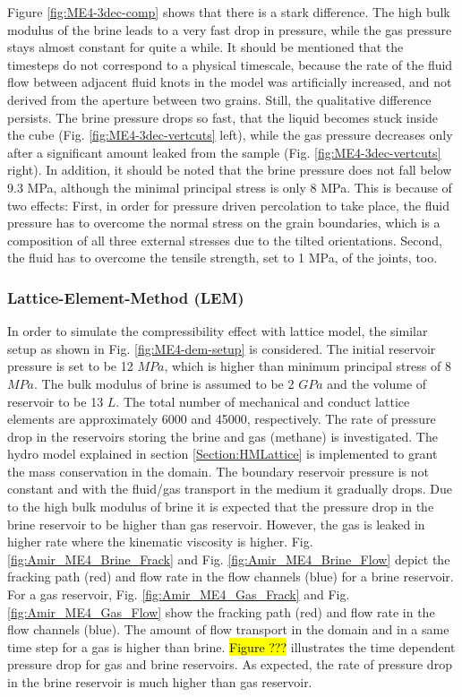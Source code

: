 Figure \ref{fig:ME4-3dec-comp} shows that there is a stark difference. The high bulk modulus of the brine leads to a very fast drop in pressure, while the gas pressure stays almost constant for quite a while. It should be mentioned that the timesteps do not correspond to a physical timescale, because the rate of the fluid flow between adjacent fluid knots in the model was artificially increased, and not derived from the aperture between two grains. Still, the qualitative difference persists. The brine pressure drops so fast, that the liquid becomes stuck inside the cube (Fig. \ref{fig:ME4-3dec-vertcuts} left), while the gas pressure decreases only after a significant amount leaked from the sample (Fig. \ref{fig:ME4-3dec-vertcuts} right). In addition, it should be noted that the brine pressure does not fall below 9.3 MPa, although the minimal principal stress is only 8 MPa. This is because of two effects: First, in order for pressure driven percolation to take place, the fluid pressure has to overcome the normal stress on the grain boundaries, which is a composition of all three external stresses due to the tilted orientations. Second, the fluid has to overcome the tensile strength, set to 1 MPa, of the joints, too. 

\subsubsection*{Lattice-Element-Method (LEM)}

In order to simulate the compressibility effect with lattice model, the similar setup as shown in Fig. \ref{fig:ME4-dem-setup} is considered. The initial reservoir pressure is set to be 12 $MPa$, which is higher than minimum principal stress of 8 $MPa$. The bulk modulus of brine is assumed to be 2 $GPa$ and the volume of reservoir to be 13 $L$. The total number of mechanical and conduct lattice elements are approximately 6000 and 45000, respectively. The rate of pressure drop in the reservoirs storing the brine and gas (methane) is investigated. The hydro model explained in section \ref{Section:HMLattice} is implemented to grant the mass conservation in the domain. The boundary reservoir pressure is not constant and with the fluid/gas transport in the medium it gradually drops. Due to the high bulk modulus of brine it is expected that the pressure drop in the brine reservoir to be higher than gas reservoir. However, the gas is leaked in higher rate where the kinematic viscosity is higher. Fig. \ref{fig:Amir_ME4_Brine_Frack} and Fig. \ref{fig:Amir_ME4_Brine_Flow} depict the fracking path (red) and flow rate in the flow channels (blue) for a brine reservoir. For a gas reservoir, Fig. \ref{fig:Amir_ME4_Gas_Frack} and Fig. \ref{fig:Amir_ME4_Gas_Flow} show the fracking path (red) and flow rate in the flow channels (blue). The amount of flow transport in the domain and in a same time step for a gas is higher than brine. \hl{Figure ???} illustrates the time dependent pressure drop for gas and brine reservoirs. As expected, the rate of pressure drop in the brine reservoir is much higher than gas reservoir.

